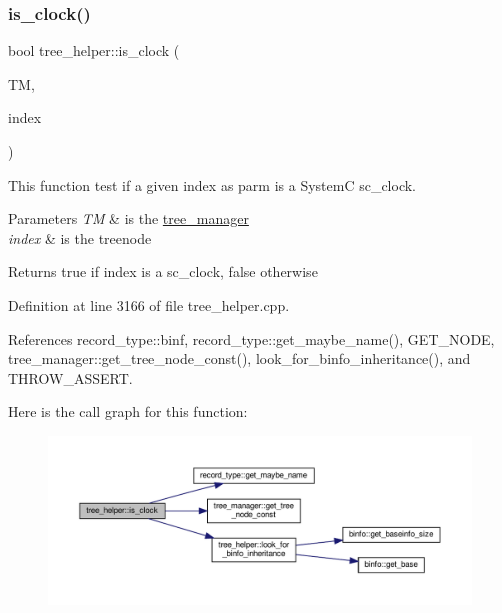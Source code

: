 \subsubsection{\texorpdfstring{is\+\_\+clock()}{is\_clock()}}
{\footnotesize\ttfamily bool tree\+\_\+helper\+::is\+\_\+clock (\begin{DoxyParamCaption}\item[{const \hyperlink{tree__manager_8hpp_a792e3f1f892d7d997a8d8a4a12e39346}{tree\+\_\+manager\+Const\+Ref} \&}]{TM,  }\item[{const unsigned int}]{index }\end{DoxyParamCaption})\hspace{0.3cm}{\ttfamily [static]}}



This function test if a given index as parm is a SystemC sc\+\_\+clock. 


\begin{DoxyParams}{Parameters}
{\em TM} & is the \hyperlink{classtree__manager}{tree\+\_\+manager} \\
\hline
{\em index} & is the treenode \\
\hline
\end{DoxyParams}
\begin{DoxyReturn}{Returns}
true if index is a sc\+\_\+clock, false otherwise 
\end{DoxyReturn}


Definition at line 3166 of file tree\+\_\+helper.\+cpp.



References record\+\_\+type\+::binf, record\+\_\+type\+::get\+\_\+maybe\+\_\+name(), G\+E\+T\+\_\+\+N\+O\+DE, tree\+\_\+manager\+::get\+\_\+tree\+\_\+node\+\_\+const(), look\+\_\+for\+\_\+binfo\+\_\+inheritance(), and T\+H\+R\+O\+W\+\_\+\+A\+S\+S\+E\+RT.

Here is the call graph for this function\+:
\nopagebreak
\begin{figure}[H]
\begin{center}
\leavevmode
\includegraphics[width=350pt]{d7/d99/classtree__helper_aa499e91ca23843d84379d18832867ea6_cgraph}
\end{center}
\end{figure}
\mbox{\label{classtree__helper_a206f57e4526ced92c69fa511c2ddc2da}} 
